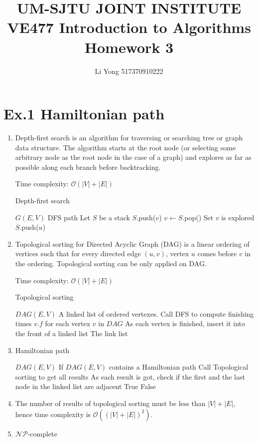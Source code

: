 \documentclass[a4paper]{article}
\title{UM-SJTU JOINT INSTITUTE\\VE477 Introduction to Algorithms\\\vspace{0.5cm} Homework 3}
\author{Li Yong 517370910222}
\begin{document}
\maketitle
\newpage

\section*{Ex.1 Hamiltonian path}
\begin{enumerate}
	\item Depth-first search is an algorithm for traversing or searching tree or graph data structure. The algorithm starts at the root node (or selecting some arbitrary node as the root node in the case of a graph) and explores as far as possible along each branch before backtracking.\par
	Time complexity: $\mathcal{O}(|V| + |E|)$
	\begin{algorithm}
		\caption{Depth-first search}
		\begin{algorithmic}[1]
			\Require $G(E,V)$
			\Ensure DFS path
			\State Let $S$ be a stack
			\State $S$.push($v$)
				\State $v\leftarrow S$.pop()
					\State Set $v$ is explored
						\State $S$.push($u$)
					\EndFor
				\EndIf
			\EndWhile
		\end{algorithmic}
	\end{algorithm}
	\item Topological sorting for Directed Acyclic Graph (DAG) is a linear ordering of vertices such that for every directed edge $(u, v)$, vertex $u$ comes before $v$ in the ordering. Topological sorting can be only applied on DAG.\par
	Time complexity: $\mathcal{O}(|V|+|E|)$
	\begin{algorithm}
		\caption{Topological sorting}
		\begin{algorithmic}[1]
			\Require $DAG(E,V)$
			\Ensure A linked list of ordered vertexes.
			\State Call DFS to compute finishing times $v.f$ for each vertex $v$ in $DAG$
			\State As each vertex is finished, insert it into the front of a linked list
			\State\Return The link list
		\end{algorithmic}
	\end{algorithm}
	\item
	\begin{algorithm}
		\caption{Hamiltonian path}
		\begin{algorithmic}[1]
			\Require $DAG(E,V)$
			\Ensure If $DAG(E,V)$ contains a Hamiltonian path
			\State Call Topological sorting to get all results
			\State As each result is got, check if the first and the last node in the linked list are adjacent
			\If{there exists one result satisfies}
				\State \Return True
			\EndIf
			\State \Return False
		\end{algorithmic}
	\end{algorithm}
	\item The number of results of topological sorting must be less than $|V|+|E|$, hence time complexity is $\mathcal{O}((|V|+|E|)^2)$.
	\item $\mathcal{NP}$-complete


\end{enumerate}
\end{document}
